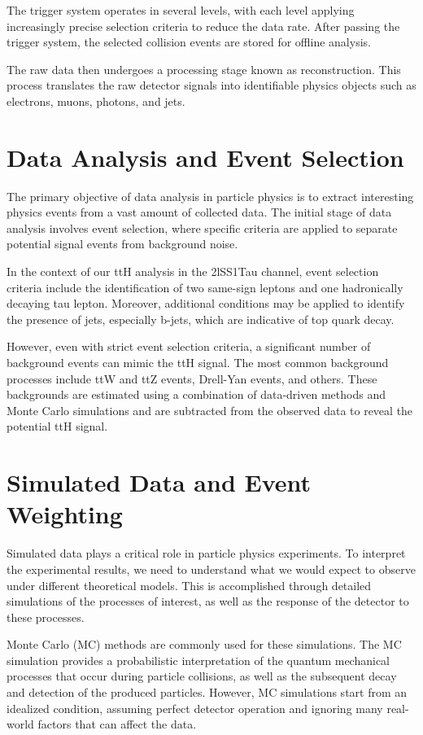The trigger system operates in several levels, with each level applying increasingly precise selection criteria to
reduce the data rate. After passing the trigger system, the selected collision events are stored for offline analysis.

The raw data then undergoes a processing stage known as reconstruction. This process translates the raw detector signals
into identifiable physics objects such as electrons, muons, photons, and jets.

\section{Data Analysis and Event Selection}

The primary objective of data analysis in particle physics is to extract interesting physics events from a vast amount
of collected data. The initial stage of data analysis involves event selection, where specific criteria are applied to
separate potential signal events from background noise.

In the context of our ttH analysis in the 2lSS1Tau channel, event selection criteria include the identification of two
same-sign leptons and one hadronically decaying tau lepton. Moreover, additional conditions may be applied to identify
the presence of jets, especially b-jets, which are indicative of top quark decay.

However, even with strict event selection criteria, a significant number of background events can mimic the ttH signal.
The most common background processes include ttW and ttZ events, Drell-Yan events, and others. These backgrounds are
estimated using a combination of data-driven methods and Monte Carlo simulations and are subtracted from the observed
data to reveal the potential ttH signal.

\section{Simulated Data and Event Weighting}

Simulated data plays a critical role in particle physics experiments. To interpret the experimental results, we need to
understand what we would expect to observe under different theoretical models. This is accomplished through detailed
simulations of the processes of interest, as well as the response of the detector to these processes.

Monte Carlo (MC) methods are commonly used for these simulations. The MC simulation provides a probabilistic
interpretation of the quantum mechanical processes that occur during particle collisions, as well as the subsequent
decay and detection of the produced particles. However, MC simulations start from an idealized condition, assuming
perfect detector operation and ignoring many real-world factors that can affect the data.

